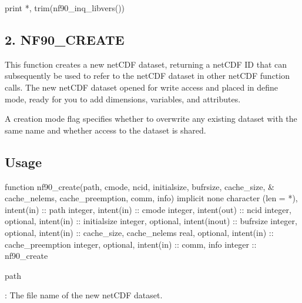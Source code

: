 \begin{DoxyCode}
print *, trim(nf90\_inq\_libvers())
\end{DoxyCode}
\hypertarget{f90_datasets_f90-nf90_create}{}\subsection{2. N\+F90\+\_\+\+C\+R\+E\+A\+T\+E }\label{f90_datasets_f90-nf90_create}
This function creates a new net\+C\+DF dataset, returning a net\+C\+DF ID that can subsequently be used to refer to the net\+C\+DF dataset in other net\+C\+DF function calls. The new net\+C\+DF dataset opened for write access and placed in define mode, ready for you to add dimensions, variables, and attributes.

A creation mode flag specifies whether to overwrite any existing dataset with the same name and whether access to the dataset is shared.

\subsection*{Usage}


\begin{DoxyCode}
\textcolor{keyword}{function }nf90\_create(path, cmode, ncid, initialsize, bufrsize, cache\_size, &
     cache\_nelems, cache\_preemption, comm, info)
  \textcolor{keywordtype}{implicit none}
  \textcolor{keywordtype}{character (len = *)}, \textcolor{keywordtype}{intent(in)} :: path
  \textcolor{keywordtype}{integer}, \textcolor{keywordtype}{intent(in)} :: cmode
  \textcolor{keywordtype}{integer}, \textcolor{keywordtype}{intent(out)} :: ncid
  \textcolor{keywordtype}{integer}, \textcolor{keywordtype}{optional}, \textcolor{keywordtype}{intent(in)} :: initialsize
  \textcolor{keywordtype}{integer}, \textcolor{keywordtype}{optional}, \textcolor{keywordtype}{intent(inout)} :: bufrsize
  \textcolor{keywordtype}{integer}, \textcolor{keywordtype}{optional}, \textcolor{keywordtype}{intent(in)} :: cache\_size, cache\_nelems
  \textcolor{keywordtype}{real}, \textcolor{keywordtype}{optional}, \textcolor{keywordtype}{intent(in)} :: cache\_preemption
  \textcolor{keywordtype}{integer}, \textcolor{keywordtype}{optional}, \textcolor{keywordtype}{intent(in)} :: comm, info
  \textcolor{keywordtype}{integer} :: nf90\_create
\end{DoxyCode}


{\ttfamily path}

\+: The file name of the new net\+C\+DF dataset.


